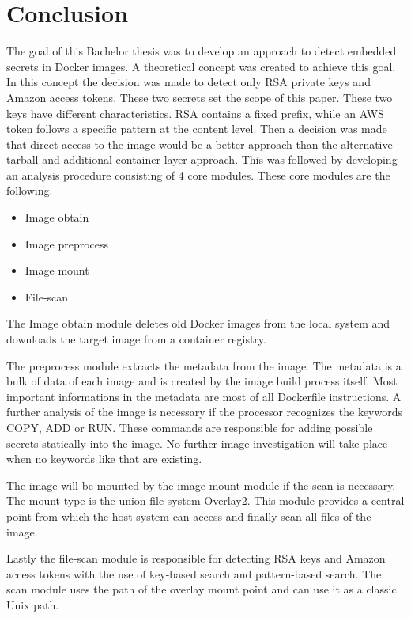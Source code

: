\chapter{Conclusion}
\label{ch:end:conclusion}
The goal of this Bachelor thesis was to develop an approach to detect embedded secrets in Docker images. 
A theoretical concept was created to achieve this goal. 
In this concept the decision was made to detect only RSA private keys and Amazon access tokens.
These two secrets set the scope of this paper. These two keys have different characteristics.
RSA contains a fixed prefix, while an AWS token follows a specific pattern at the content level.
Then a decision was made that direct access to the image would be a better approach than the alternative tarball and additional container layer approach.
This was followed by developing an analysis procedure consisting of 4 core modules.
These core modules are the following.
\begin{itemize}
    \item Image obtain
    \item Image preprocess
    \item Image mount
    \item File-scan
    \end{itemize}
The Image obtain module deletes old Docker images from the local system and downloads the target image from a container registry.

The preprocess module extracts the metadata from the image. 
The metadata is a bulk of data of each image and is created by the image build process itself.
Most important informations in the metadata are most of all Dockerfile instructions.
A further analysis of the image is necessary if the processor recognizes the keywords COPY, ADD or RUN.
These commands are responsible for adding possible secrets statically into the image. 
No further image investigation will take place when no keywords like that are existing. 

The image will be mounted by the image mount module if the scan is necessary. The mount type is the union-file-system Overlay2.
This module provides a central point from which the host system can access and finally scan all files of the image.

Lastly the file-scan module is responsible for detecting RSA keys and Amazon access tokens with the use of key-based search and pattern-based search.
The scan module uses the path of the overlay mount point and can use it as a classic Unix path.

